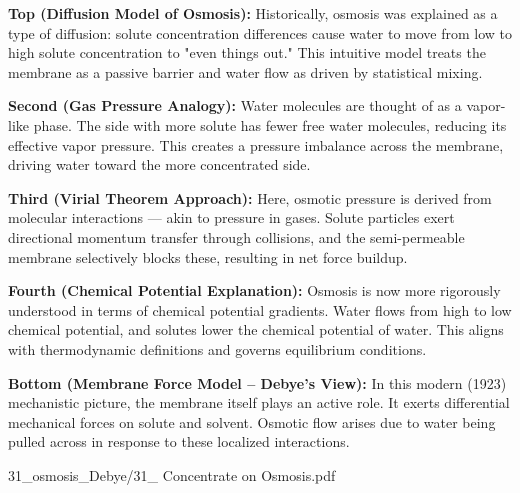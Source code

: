 \begin{SideNotePage}{
  \textbf{Top (Diffusion Model of Osmosis):}  
  Historically, osmosis was explained as a type of diffusion: solute concentration differences cause water to move from low to high solute concentration to "even things out." This intuitive model treats the membrane as a passive barrier and water flow as driven by statistical mixing. \par

  \textbf{Second (Gas Pressure Analogy):}  
  Water molecules are thought of as a vapor-like phase. The side with more solute has fewer free water molecules, reducing its effective vapor pressure. This creates a pressure imbalance across the membrane, driving water toward the more concentrated side. \par

  \textbf{Third (Virial Theorem Approach):}  
  Here, osmotic pressure is derived from molecular interactions — akin to pressure in gases. Solute particles exert directional momentum transfer through collisions, and the semi-permeable membrane selectively blocks these, resulting in net force buildup. \par

  \textbf{Fourth (Chemical Potential Explanation):}  
  Osmosis is now more rigorously understood in terms of chemical potential gradients. Water flows from high to low chemical potential, and solutes lower the chemical potential of water. This aligns with thermodynamic definitions and governs equilibrium conditions. \par

  \textbf{Bottom (Membrane Force Model – Debye's View):}  
  In this modern (1923) mechanistic picture, the membrane itself plays an active role. It exerts differential mechanical forces on solute and solvent. Osmotic flow arises due to water being pulled across in response to these localized interactions. \par
}{31_osmosis_Debye/31_ Concentrate on Osmosis.pdf}
\end{SideNotePage}

